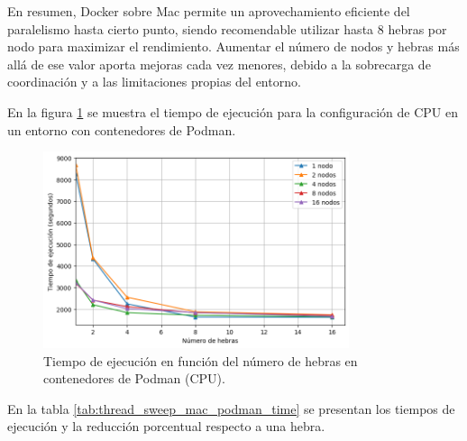 En resumen, Docker sobre Mac permite un aprovechamiento eficiente del paralelismo hasta cierto punto, siendo recomendable utilizar hasta 8 hebras por nodo para maximizar el rendimiento. Aumentar el número de nodos y hebras más allá de ese valor aporta mejoras cada vez menores, debido a la sobrecarga de coordinación y a las limitaciones propias del entorno.

En la figura \ref{fig:thread_sweep_mac_podman_time} se muestra el tiempo de ejecución para la configuración de CPU en un entorno con contenedores de Podman.

\begin{figure}[H]
    \centering
    \includegraphics[width=0.8\textwidth]{imagenes/cap5/thread_sweep_mac_podman_time.png}
    \caption{Tiempo de ejecución en función del número de hebras en contenedores de Podman (CPU).}
    \label{fig:thread_sweep_mac_podman_time}
\end{figure}

En la tabla \ref{tab:thread_sweep_mac_podman_time} se presentan los tiempos de ejecución y la reducción porcentual respecto a una hebra.

